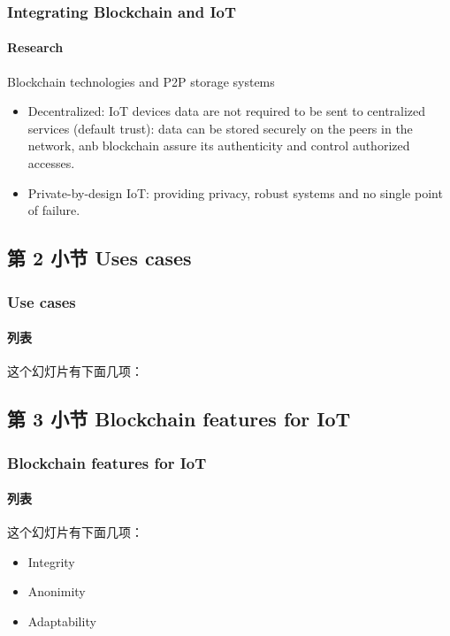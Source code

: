 \documentclass[
    aspectratio=169,                   %
]{beamer}
\begin{document}
    \begin{frame}
        \frametitle{Integrating Blockchain and IoT}

        \paragraph{Research} \alert{Blockchain technologies} and \alert{P2P storage systems}

        \begin{itemize}
            \item Decentralized: IoT devices data are not required to be sent to centralized services \alert{(default trust)}: data can be stored securely on the peers in the network, anb blockchain assure its authenticity and control authorized accesses.
            \item Private-by-design IoT: providing privacy, robust systems and no single point of failure.
        \end{itemize}

    \end{frame}

\subsection{第 2 小节 Uses cases}

    \begin{frame}
        \frametitle{Use cases}

        \paragraph{列表} 这个\alert{幻灯片}有下面几项：

    \end{frame}

\subsection{第 3 小节 Blockchain features for IoT}

    \begin{frame}
        \frametitle{Blockchain features for IoT}

        \paragraph{列表} 这个\alert{幻灯片}有下面几项：

        \begin{itemize}
            \item Integrity
            \item Anonimity
            \item Adaptability
        \end{itemize}

    \end{frame}
\end{document}
